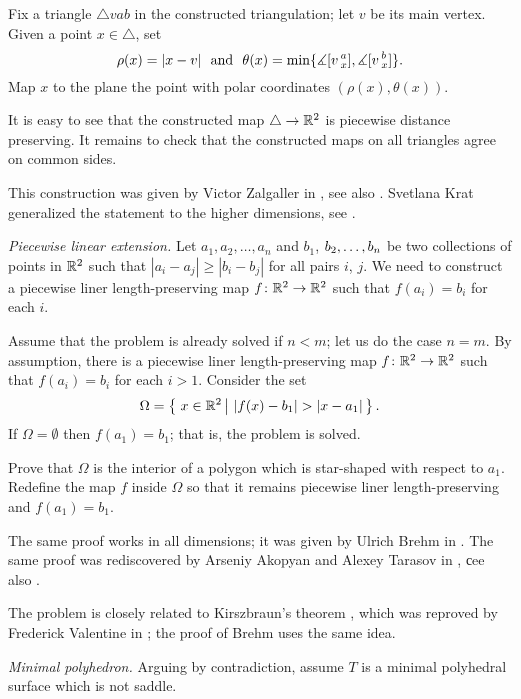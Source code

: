 Fix a triangle $\triangle vab$ in the constructed triangulation; 
let $v$ be its main vertex.
Given a point 
$x\in  \triangle$, set 
\[\rho(x)=|x-v|\ \ \text{and}\ \  \theta(x)=\min \{\measuredangle \hinge vax,\measuredangle\hinge vbx\}.\]
Map $x$ to the plane the point with polar coordinates $(\rho(x),\theta(x))$.

It is easy to see that the constructed map $\triangle\to\mathbb{R}^2$ is piecewise distance preserving.
It remains to check that the constructed maps on all triangles agree on common sides.


This construction was given by Victor Zalgaller in \cite{zalgaller-polyhedra}, see also \cite{petrunin-yashinsky}.
Svetlana Krat generalized the statement to the higher dimensions,
see \cite{krat}.



\textit{Piecewise linear extension.}
Let $a_1,a_2,\dots,a_n$
and $b_1$, $b_2,\z\dots,b_n$
be two collections of points in $\mathbb{R}^2$
such that $|a_i-a_j|\ge |b_i-b_j|$ for all pairs $i$, $j$.
We need to construct a piecewise liner length-preserving map $f\colon\mathbb{R}^2\to\mathbb{R}^2$
such that $f(a_i)=b_i$ for each $i$.

Assume that the problem is already solved if $n<m$;
let us do the case $n=m$.
By assumption, 
there is a piecewise liner length-preserving map $f\colon\mathbb{R}^2\to\mathbb{R}^2$
such that $f(a_i)=b_i$ for each $i>1$.
Consider the set 
\[\Omega=\set{x\in\RR^2}{|f(x)-b_1|>|x-a_1|}.\]
If $\Omega=\emptyset$ then $f(a_1)=b_1$; 
that is, the problem is solved.

Prove that $\Omega$ is the interior of a polygon
which is star-shaped with respect to $a_1$.
Redefine the map $f$ inside $\Omega$ so that it remains piecewise liner length-preserving and $f(a_1)=b_1$.

The same proof works in all dimensions;
it was given by Ulrich Brehm in \cite{brehm}.
The same proof was rediscovered by Arseniy Akopyan and Alexey Tarasov in \cite{akopyan-tarasov},
сee also \cite{petrunin-yashinsky}.

The problem is closely related to Kirszbraun's theorem \cite{kirszbraun},
which was reproved by Frederick Valentine in \cite{valentine};
the proof of Brehm uses the same idea.






\textit{Minimal polyhedron.}
Arguing by contradiction, assume $T$ is a minimal polyhedral surface which is not saddle.

